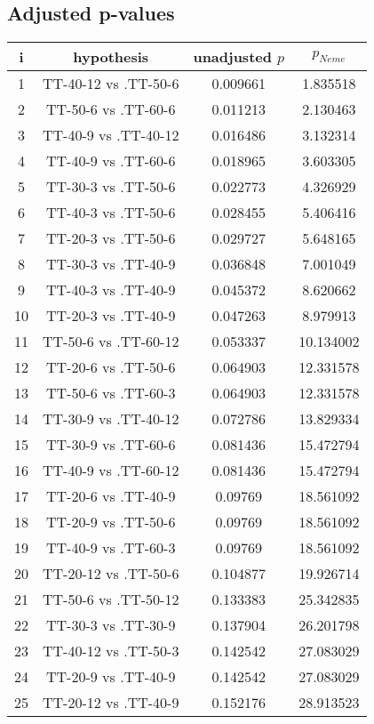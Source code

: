 \documentclass[a4paper,10pt]{article}
\begin{document}
\begin{landscape}
\pagebreak

\subsection{Adjusted p-values}

\begin{table}[!htp]
\centering\scriptsize
\begin{tabular}{cccc}
i&hypothesis&unadjusted $p$&$p_{Neme}$\\
\hline1&TT-40-12 vs .TT-50-6&0.009661&1.835518\\
2&TT-50-6 vs .TT-60-6&0.011213&2.130463\\
3&TT-40-9 vs .TT-40-12&0.016486&3.132314\\
4&TT-40-9 vs .TT-60-6&0.018965&3.603305\\
5&TT-30-3 vs .TT-50-6&0.022773&4.326929\\
6&TT-40-3 vs .TT-50-6&0.028455&5.406416\\
7&TT-20-3 vs .TT-50-6&0.029727&5.648165\\
8&TT-30-3 vs .TT-40-9&0.036848&7.001049\\
9&TT-40-3 vs .TT-40-9&0.045372&8.620662\\
10&TT-20-3 vs .TT-40-9&0.047263&8.979913\\
11&TT-50-6 vs .TT-60-12&0.053337&10.134002\\
12&TT-20-6 vs .TT-50-6&0.064903&12.331578\\
13&TT-50-6 vs .TT-60-3&0.064903&12.331578\\
14&TT-30-9 vs .TT-40-12&0.072786&13.829334\\
15&TT-30-9 vs .TT-60-6&0.081436&15.472794\\
16&TT-40-9 vs .TT-60-12&0.081436&15.472794\\
17&TT-20-6 vs .TT-40-9&0.09769&18.561092\\
18&TT-20-9 vs .TT-50-6&0.09769&18.561092\\
19&TT-40-9 vs .TT-60-3&0.09769&18.561092\\
20&TT-20-12 vs .TT-50-6&0.104877&19.926714\\
21&TT-50-6 vs .TT-50-12&0.133383&25.342835\\
22&TT-30-3 vs .TT-30-9&0.137904&26.201798\\
23&TT-40-12 vs .TT-50-3&0.142542&27.083029\\
24&TT-20-9 vs .TT-40-9&0.142542&27.083029\\
25&TT-20-12 vs .TT-40-9&0.152176&28.913523\\

\end{tabular}
\end{table}
\end{landscape}
\end{document}
